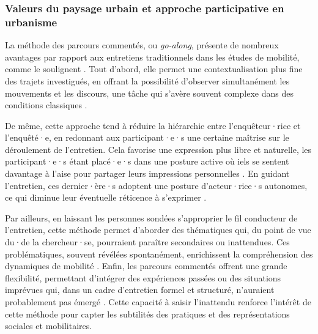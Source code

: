 \begin{refsegment}
\subsubsection*{Valeurs du paysage urbain et approche participative en urbanisme
    \label{chap3:parcours-commente-definition-generale}
    }

La méthode des parcours commentés, ou \textit{go-along}, présente de nombreux avantages par rapport aux entretiens traditionnels dans les études de mobilité, comme le soulignent \textcolor{blue}{\textcite[3]{despres_replacer_2019}}. Tout d’abord, elle permet une contextualisation plus fine des trajets investigués, en offrant la possibilité d’observer simultanément les mouvements et les discours, une tâche qui s’avère souvent complexe dans des conditions classiques \textcolor{blue}{\autocite[119]{bergeron_uncovering_2014}}.%

De même, cette approche tend à réduire la hiérarchie entre l’enquêteur·rice et l’enquêté·e, en redonnant aux participant·e·s une certaine maîtrise sur le déroulement de l’entretien. Cela favorise une expression plus libre et naturelle, les participant·e·s étant placé·e·s dans une posture active où iels se sentent davantage à l’aise pour partager leurs impressions personnelles \textcolor{blue}{\autocite[120]{bergeron_uncovering_2014}}. En guidant l'entretien, ces dernier·ère·s adoptent une posture d’acteur·rice·s autonomes, ce qui diminue leur éventuelle réticence à s’exprimer \textcolor{blue}{\autocites[264]{carpiano_come_2009}[850]{evans_walking_2011}}.%

Par ailleurs, en laissant les personnes sondées s’approprier le fil conducteur de l’entretien, cette méthode permet d’aborder des thématiques qui, du point de vue du·de la chercheur·se, pourraient paraître secondaires ou inattendues. Ces problématiques, souvent révélées spontanément, enrichissent la compréhension des dynamiques de mobilité \textcolor{blue}{\autocite[463]{kusenbach_street_2003}}. Enfin, les parcours commentés offrent une grande flexibilité, permettant d’intégrer des expériences passées ou des situations imprévues qui, dans un cadre d’entretien formel et structuré, n’auraient probablement pas émergé \textcolor{blue}{\autocite[464]{kusenbach_street_2003}}. Cette capacité à saisir l’inattendu renforce l’intérêt de cette méthode pour capter les subtilités des pratiques et des représentations sociales et mobilitaires.%


\end{refsegment}
